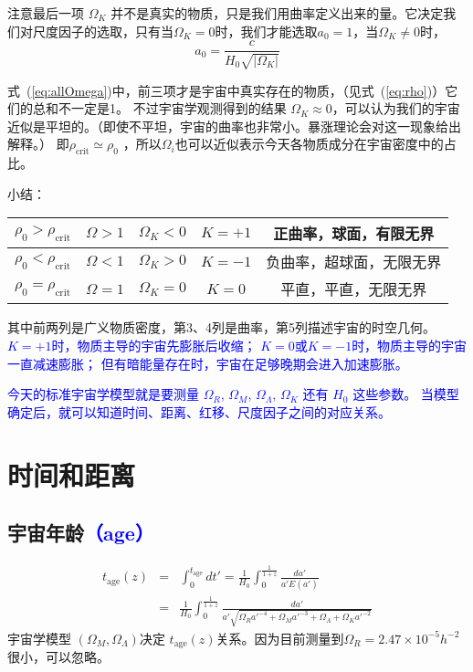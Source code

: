 \documentclass[12pt]{ctexart}
\newcommand{\new}[1]{\textcolor{blue}{#1}}
\newcommand{\refeq}[1]{式~(\ref{#1})}
\begin{document}
注意最后一项 $\Omega_K$ 并不是真实的物质，只是我们用曲率定义出来的量。它决定我们对尺度因子的选取，只有当$\Omega_K = 0$时，我们才能选取$a_0=1$，当$\Omega_K\neq 0$时，
\begin{equation}
    a_0=\frac{c}{H_0\sqrt{|\Omega_K|}} 
\end{equation} 


\refeq{eq:allOmega}中，前三项才是宇宙中真实存在的物质，（见\refeq{eq:rho}）它们的总和不一定是1。
不过宇宙学观测得到的结果 $\Omega_K \approx 0$，可以认为我们的宇宙近似是平坦的。（即使不平坦，宇宙的曲率也非常小。暴涨理论会对这一现象给出解释。） 
即$\rho_\text{crit}\simeq\rho_0$ ，所以$\Omega_i$也可以近似表示今天各物质成分在宇宙密度中的占比。

小结：
\begin{table}[H]
    \centering
    \begin{tabular}{|c|c|c|c|c|}
    \hline
    $\rho_0>\rho_\text{crit}$  & $\Omega>1$ & $\Omega_K<0$ & $K=+1$ & 正曲率，球面，有限无界 \\ \hline
    $\rho_0<\rho_\text{crit}$  & $\Omega<1$ & $\Omega_K>0$ & $K=-1$ & 负曲率，超球面，无限无界  \\ \hline
    $\rho_0=\rho_\text{crit}$  & $\Omega=1$ & $\Omega_K=0$ & $K=0$ & 平直，平直，无限无界 \\ \hline
    \end{tabular}
\end{table}
其中前两列是广义物质密度，第3、4列是曲率，第5列描述宇宙的时空几何。
\new{
$K=+1$时，物质主导的宇宙先膨胀后收缩；
$K=0$或$K=-1$时，物质主导的宇宙一直减速膨胀；
但有暗能量存在时，宇宙在足够晚期会进入加速膨胀。
}

\new{今天的标准宇宙学模型就是要测量 $\Omega_R$, $\Omega_M$, $\Omega_\Lambda$, $\Omega_K$ 还有 $H_0$ 这些参数。
当模型确定后，就可以知道时间、距离、红移、尺度因子之间的对应关系。}

\section{时间和距离}
\subsection{宇宙年龄\new{（age）}}

\begin{eqnarray}
    t_\text{age}(z) &=& \int_0^{t_\text{age}} dt' = \frac{1}{H_0}\int_0^\frac{1}{1+z} \frac{da'}{a' E(a')} \\ 
    &=& \frac{1}{H_0}\int_0^\frac{1}{1+z} \frac{da'}{a' \sqrt{\Omega_R a'^{-4}+\Omega_M a'^{-3}+\Omega_\Lambda+\Omega_K a'^{-2}}}
\end{eqnarray}
宇宙学模型 $\left(\Omega_M, \Omega_\Lambda\right) $决定 $t_\text{age}(z)$关系。因为目前测量到$\Omega_R = 2.47\times10^{-5}h^{-2}$很小，可以忽略。
\end{document}
